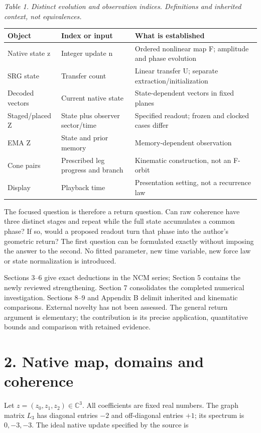\documentclass[11pt,a4paper]{article}
\begin{document}
\par\textit{Table 1. Distinct evolution and observation indices. Definitions and inherited context, not equivalences.}\par
\begingroup\small
\begin{tabularx}{\textwidth}{XXX}
\toprule
Object & Index or input & What is established\\\midrule
Native state z & Integer update n & Ordered nonlinear map F; amplitude and phase evolution\\
SRG state & Transfer count & Linear transfer U; separate extraction/initialization\\
Decoded vectors & Current native state & State-dependent vectors in fixed planes\\
Staged/placed Z & State plus observer sector/time & Specified readout; frozen and clocked cases differ\\
EMA Z & State and prior memory & Memory-dependent observation\\
Cone pairs & Prescribed leg progress and branch & Kinematic construction, not an F-orbit\\
Display & Playback time & Presentation setting, not a recurrence law\\
\bottomrule\end{tabularx}\endgroup\par
The focused question is therefore a return question. Can raw coherence have three distinct stages and repeat while the full state accumulates a common phase? If so, would a proposed readout turn that phase into the author’s geometric return? The first question can be formulated exactly without imposing the answer to the second. No fitted parameter, new time variable, new force law or state normalization is introduced. \cite{D02} \cite{D03}

Sections 3–6 give exact deductions in the NCM series; Section 5 contains the newly reviewed strengthening. Section 7 consolidates the completed numerical investigation. Sections 8–9 and Appendix B delimit inherited and kinematic comparisons. External novelty has not been assessed. The general return argument is elementary; the contribution is its precise application, quantitative bounds and comparison with retained evidence.

\clearpage
\section*{2. Native map, domains and coherence}
Let $z=(z_0,z_1,z_2)\in\mathbb{C}^3$. All coefficients are fixed real numbers. The graph matrix $L_3$ has diagonal entries $-2$ and off-diagonal entries $+1$; its spectrum is $0,-3,-3$. The ideal native update specified by the source is \cite{DYN}
\end{document}
